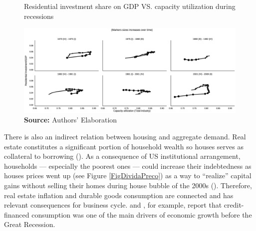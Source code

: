 \begin{figure}[H]
	\centering
	\caption{Residential investment share on GDP VS. capacity utilization during recessions}
	\label{FigIh_u}
	\includegraphics[width=\textwidth]{./figs/Ciclo_Ih_u.eps}
	\caption*{\textbf{Source:} Authors' Elaboration}
\end{figure}

There is also an indirect relation between housing and aggregate demand. 
Real estate constitutes a significant portion of household wealth so houses serves as collateral to borrowing (\cite{teixeira_uma_2011}). 
As a consequence of US institutional arrangement, households --- especially the poorest ones --- could increase their indebtedness as houses prices went up (see Figure \ref{FigDividaPreco}) as a way to ``realize'' capital gains without
selling their homes during house bubble of the 2000s (\cite{teixeira_crescimento_2015}).
Therefore, real estate inflation and durable goods consumption are connected and has relevant consequences for business cycle.
\textcite{zezza_u.s._2008} and \textcite{barba_rising_2009}, for example, report that credit-financed consumption was one of the main drivers of economic growth before the Great Recession.




